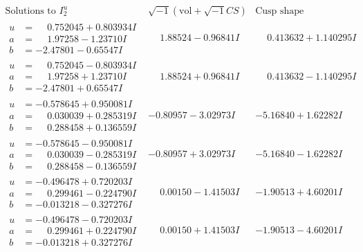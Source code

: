 \documentclass[1p]{elsarticle_modified}
\theoremstyle{definition}
\newcommand{\I}{\sqrt{-1}}
\begin{document}
$$\begin{array}{c|c|c}  
\text{Solutions to }I^u_{2}& \I (\text{vol} + \sqrt{-1}CS) & \text{Cusp shape}\\
 \hline 
\begin{aligned}
u &= \phantom{-}0.752045 + 0.803934 I \\
a &= \phantom{-}1.97258 - 1.23710 I \\
b &= -2.47801 - 0.65547 I\end{aligned}
 & \phantom{-}1.88524 - 0.96841 I & \phantom{-}0.413632 + 1.140295 I \\ \hline\begin{aligned}
u &= \phantom{-}0.752045 - 0.803934 I \\
a &= \phantom{-}1.97258 + 1.23710 I \\
b &= -2.47801 + 0.65547 I\end{aligned}
 & \phantom{-}1.88524 + 0.96841 I & \phantom{-}0.413632 - 1.140295 I \\ \hline\begin{aligned}
u &= -0.578645 + 0.950081 I \\
a &= \phantom{-}0.030039 + 0.285319 I \\
b &= \phantom{-}0.288458 + 0.136559 I\end{aligned}
 & -0.80957 - 3.02973 I & -5.16840 + 1.62282 I \\ \hline\begin{aligned}
u &= -0.578645 - 0.950081 I \\
a &= \phantom{-}0.030039 - 0.285319 I \\
b &= \phantom{-}0.288458 - 0.136559 I\end{aligned}
 & -0.80957 + 3.02973 I & -5.16840 - 1.62282 I \\ \hline\begin{aligned}
u &= -0.496478 + 0.720203 I \\
a &= \phantom{-}0.299461 - 0.224790 I \\
b &= -0.013218 - 0.327276 I\end{aligned}
 & \phantom{-}0.00150 - 1.41503 I & -1.90513 + 4.60201 I \\ \hline\begin{aligned}
u &= -0.496478 - 0.720203 I \\
a &= \phantom{-}0.299461 + 0.224790 I \\
b &= -0.013218 + 0.327276 I\end{aligned}
 & \phantom{-}0.00150 + 1.41503 I & -1.90513 - 4.60201 I \\ \hline\begin{aligned}

\end{aligned}
\end{array}$$
\end{document}
